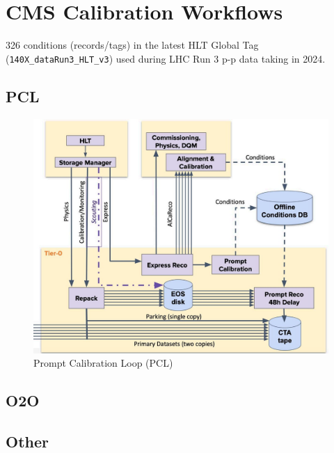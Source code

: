 \section{CMS Calibration Workflows}







326 conditions (records/tags) in the latest HLT Global Tag (\texttt{140X\_dataRun3\_HLT\_v3}) used during LHC Run 3 p-p data taking in 2024.


\subsection{PCL}

\begin{figure}[h!]	
\centering
\includegraphics[width=\textwidth]{figures/PCL.jpg} %
\caption{Prompt Calibration Loop (PCL)}
\label{fig:PCL}
\end{figure}

\subsection{O2O}
\subsection{Other}

